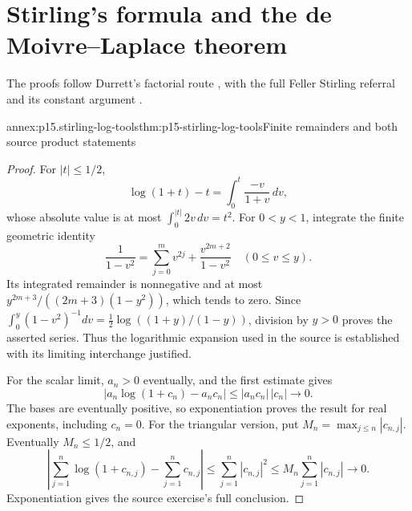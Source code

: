 \section{Stirling's formula and the de Moivre--Laplace theorem}
\label{sec:annex-p15-de-moivre-laplace-and-stirling}

The proofs follow Durrett's factorial route
\cite[Section~3.1, pp.~113--115]{DurrettPTEAuthor2019},
with the full Feller Stirling referral and its constant argument
\cite[II.9 and VII.2, pp.~51--54, 179--181]{Feller1968ProbabilityI}.

\begin{annexitem}{annex:p15.stirling-log-tools}{thm:p15-stirling-log-tools}{Finite remainders and both source product statements}
\begin{proof}
For \(|t|\leq1/2\),
\[
 \log(1+t)-t=\int_0^t\frac{-v}{1+v}\,dv,
\]
whose absolute value is at most
\(\int_0^{|t|}2v\,dv=t^2\).
For \(0<y<1\), integrate the finite geometric identity
\[
 \frac1{1-v^2}=\sum_{j=0}^m v^{2j}
                   +\frac{v^{2m+2}}{1-v^2}
 \quad(0\leq v\leq y).
\]
Its integrated remainder is nonnegative and at most
\(y^{2m+3}/((2m+3)(1-y^2))\), which tends to zero.
Since
\(\int_0^y(1-v^2)^{-1}dv=\tfrac12\log((1+y)/(1-y))\),
division by \(y>0\) proves the asserted series. Thus the
logarithmic expansion used in the source is established
with its limiting interchange justified.

For the scalar limit, \(a_n>0\) eventually, and the first
estimate gives
\[
 |a_n\log(1+c_n)-a_nc_n|
                 \leq |a_nc_n|\,|c_n|\longrightarrow0.
\]
The bases are eventually positive, so exponentiation proves
the result for real exponents, including \(c_n=0\).
For the triangular version, put
\(M_n=\max_{j\leq n}|c_{n,j}|\).
Eventually \(M_n\leq1/2\), and
\[
 \left|\sum_{j=1}^n\log(1+c_{n,j})
                  -\sum_{j=1}^nc_{n,j}\right|
 \leq\sum_{j=1}^n|c_{n,j}|^2
 \leq M_n\sum_{j=1}^n|c_{n,j}|\longrightarrow0.
\]
Exponentiation gives the source exercise's full conclusion.
\end{proof}
\end{annexitem}

